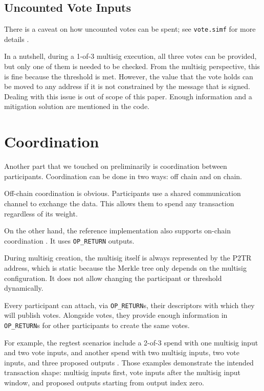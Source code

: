 \documentclass[11pt]{article}
\begin{document}
\subsection{Uncounted Vote Inputs}

There is a caveat on how uncounted votes can be spent; see \texttt{vote.simf} for more details \cite{native-multisig-vote}.

In a nutshell, during a 1-of-3 multisig execution, all three votes can be provided, but only one of them is needed to be checked.
From the multisig perspective, this is fine because the threshold is met.
However, the value that the vote holds can be moved to any address if it is not constrained by the message that is signed.
Dealing with this issue is out of scope of this paper.
Enough information and a mitigation solution are mentioned in the code.

\section{Coordination}

Another part that we touched on preliminarily is coordination between participants.
Coordination can be done in two ways: off chain and on chain.

Off-chain coordination is obvious.
Participants use a shared communication channel to exchange the data.
This allows them to spend any transaction regardless of its weight.

On the other hand, the reference implementation also supports on-chain coordination \cite{native-multisig-onchain-encoder}.
It uses \texttt{OP\_RETURN} outputs.

During multisig creation, the multisig itself is always represented by the P2TR address, which is static because the Merkle tree only depends on the multisig configuration.
It does not allow changing the participant or threshold dynamically.

Every participant can attach, via \texttt{OP\_RETURN}s, their descriptors with which they will publish votes.
Alongside votes, they provide enough information in \texttt{OP\_RETURN}s for other participants to create the same votes.

For example, the regtest scenarios include a 2-of-3 spend with one multisig input and two vote inputs, and another spend with two multisig inputs, two vote inputs, and three proposed outputs \cite{native-multisig-regtest}.
Those examples demonstrate the intended transaction shape: multisig inputs first, vote inputs after the multisig input window, and proposed outputs starting from output index zero.
\end{document}
